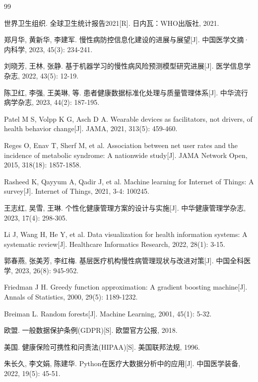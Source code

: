 
\begin{thebibliography}{99}

 世界卫生组织. 全球卫生统计报告2021[R]. 日内瓦：WHO出版社, 2021.

 郑月华, 黄新华, 李建军. 慢性病防控信息化建设的进展与展望[J]. 中国医学文摘·内科学, 2023, 45(3): 234-241.

 刘晓芳, 王林, 张静. 基于机器学习的慢性病风险预测模型研究进展[J]. 医学信息学杂志, 2022, 43(5): 12-19.

 陈卫红, 李强, 王美琳, 等. 患者健康数据标准化处理与质量管理体系[J]. 中华流行病学杂志, 2023, 44(2): 187-195.

 Patel M S, Volpp K G, Asch D A. Wearable devices as facilitators, not drivers, of health behavior change[J]. JAMA, 2021, 313(5): 459-460.

 Reges O, Enav T, Sherf M, et al. Association between net user rates and the incidence of metabolic syndrome: A nationwide study[J]. JAMA Network Open, 2015, 318(18): 1857-1858.

 Rasheed K, Qayyum A, Qadir J, et al. Machine learning for Internet of Things: A survey[J]. Internet of Things, 2021, 3-4: 100245.

 王志红, 吴雪, 王琳. 个性化健康管理方案的设计与实施[J]. 中华健康管理学杂志, 2023, 17(4): 298-305.

 Li J, Wang H, He Y, et al. Data visualization for health information systems: A systematic review[J]. Healthcare Informatics Research, 2022, 28(1): 3-15.

 郭春燕, 张美芳, 李红梅. 基层医疗机构慢性病管理现状与改进对策[J]. 中国全科医学, 2023, 26(8): 945-952.

 Friedman J H. Greedy function approximation: A gradient boosting machine[J]. Annals of Statistics, 2000, 29(5): 1189-1232.

 Breiman L. Random forests[J]. Machine Learning, 2001, 45(1): 5-32.

 欧盟. 一般数据保护条例(GDPR)[S]. 欧盟官方公报, 2018.

 美国. 健康保险可携性和问责法(HIPAA)[S]. 美国联邦法规, 1996.

 朱长久, 李文娟, 陈建华. Python在医疗大数据分析中的应用[J]. 中国医学装备, 2022, 19(5): 45-51.

\end{thebibliography}
